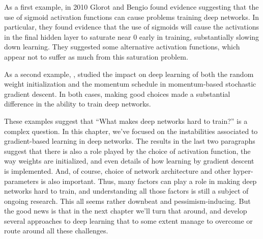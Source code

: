 As a first example, in 2010 Glorot and Bengio  found evidence suggesting that the use of sigmoid activation functions can cause problems training deep networks. In particular, they found evidence that the use of sigmoids will cause the activations in the final hidden layer to saturate near 0 early in training, substantially slowing down learning. They suggested some alternative activation functions, which appear not to suffer as much from this saturation problem.

As a second example, \cite{Sutskever:2013:IIM:3042817.3043064}, studied the impact on deep learning of both the random weight initialization and the momentum schedule in momentum-based stochastic gradient descent. In both cases, making good choices made a substantial difference in the ability to train deep networks.

These examples suggest that ``What makes deep networks hard to train?'' is a complex question. In this chapter, we've focused on the instabilities associated to gradient-based learning in deep networks. The results in the last two paragraphs suggest that there is also a role played by the choice of activation function, the way weights are initialized, and even details of how learning by gradient descent is implemented. And, of course, choice of network architecture and other hyper-parameters is also important. Thus, many factors can play a role in making deep networks hard to train, and understanding all those factors is still a subject of ongoing research. This all seems rather downbeat and pessimism-inducing. But the good news is that in the next chapter we'll turn that around, and develop several approaches to deep learning that to some extent manage to overcome or route around all these challenges.


